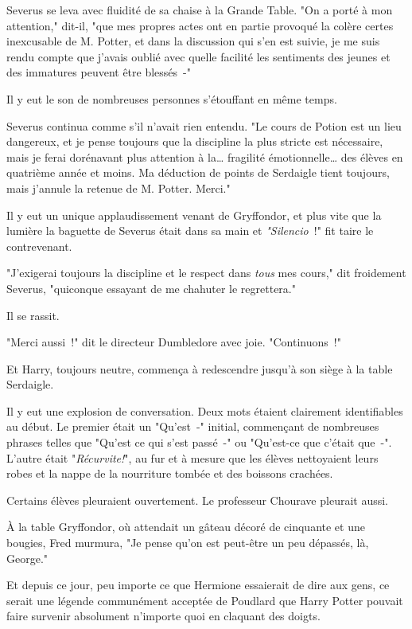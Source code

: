 Severus se leva avec fluidité de sa chaise à la Grande Table. "On a porté à mon attention," dit-il, "que mes propres actes ont en partie provoqué la colère certes inexcusable de M. Potter, et dans la discussion qui s'en est suivie, je me suis rendu compte que j'avais oublié avec quelle facilité les sentiments des jeunes et des immatures peuvent être blessés~-"

Il y eut le son de nombreuses personnes s'étouffant en même temps.

Severus continua comme s'il n'avait rien entendu. "Le cours de Potion est un lieu dangereux, et je pense toujours que la discipline la plus stricte est nécessaire, mais je ferai dorénavant plus attention à la… fragilité émotionnelle… des élèves en quatrième année et moins. Ma déduction de points de Serdaigle tient toujours, mais j'annule la retenue de M. Potter. Merci."

Il y eut un unique applaudissement venant de Gryffondor, et plus vite que la lumière la baguette de Severus était dans sa main et \emph{"Silencio}~!" fit taire le contrevenant.

"J'exigerai toujours la discipline et le respect dans \emph{tous} mes cours," dit froidement Severus, "quiconque essayant de me chahuter le regrettera."

Il se rassit.

"Merci aussi~!" dit le directeur Dumbledore avec joie. "Continuons~!"

Et Harry, toujours neutre, commença à redescendre jusqu'à son siège à la table Serdaigle.

Il y eut une explosion de conversation. Deux mots étaient clairement identifiables au début. Le premier était un "Qu'est~-" initial, commençant de nombreuses phrases telles que "Qu'est ce qui s'est passé~-" ou "Qu'est-ce que c'était que~-". L'autre était "\emph{Récurvite!}", au fur et à mesure que les élèves nettoyaient leurs robes et la nappe de la nourriture tombée et des boissons crachées.

Certains élèves pleuraient ouvertement. Le professeur Chourave pleurait aussi.

À la table Gryffondor, où attendait un gâteau décoré de cinquante et une bougies, Fred murmura, "Je pense qu'on est peut-être un peu dépassés, là, George."

Et depuis ce jour, peu importe ce que Hermione essaierait de dire aux gens, ce serait une légende communément acceptée de Poudlard que Harry Potter pouvait faire survenir absolument n'importe quoi en claquant des doigts.~ 

